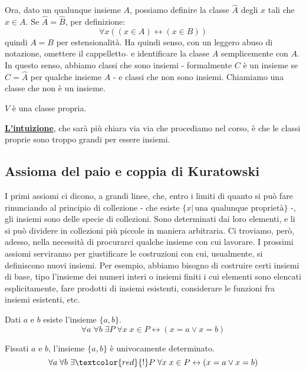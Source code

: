\documentclass[11pt]{scrartcl}
\begin{document}
Ora, dato un qualunque insieme $A$, possiamo definire la classe $\hat{A}$ degli $x$ tali che $x \in A$. Se $\hat{A} = \hat{B}$, per definizione:
\[ \forall x ((x \in A) \leftrightarrow (x \in B))
	\]
quindi $A = B$ per estensionalità. Ha quindi senso, con un leggero abuso di notazione, omettere il cappelletto $\hat{}$ e identificare la classe $\hat{A}$ semplicemente con $A$. In questo senso,
abbiamo classi che sono insiemi - formalmente $C$ è un insieme se $C = \hat{A}$ per qualche insieme $A$ - e classi che non sono insiemi. Chiamiamo  una classe che non è un insieme.

\begin{example}
$V$ è una classe propria.
\end{example}

\textbf{\underline{L'intuizione}}, che sarà più chiara via via che procediamo nel corso, è che le classi proprie sono troppo grandi per essere insiemi.

\subsection{Assioma del paio e coppia di Kuratowski}
I primi assiomi ci dicono, a grandi linee, che, entro i limiti di quanto si può fare rinunciando al principio di collezione - che esiste $\{x | \, \text{una qualunque proprietà}\}$ -, gli insiemi sono delle specie di collezioni.
Sono determinati dai loro elementi, e li si può dividere in collezioni più piccole in maniera arbitraria. Ci troviamo, però, adesso, nella necessità di procurarci qualche insieme con cui lavorare. I prossimi assiomi serviranno per giustificare le costruzioni con cui,
usualmente, si definiscono nuovi insiemi. Per esempio, abbiamo bisogno di costruire certi insiemi di base, tipo l'insieme dei numeri interi o insiemi finiti i cui elementi sono elencati esplicitamente, fare prodotti di insiemi esistenti, 
considerare le funzioni fra insiemi esistenti, etc.

\begin{axiom}
\label{ax4}
Dati $a$ e $b$ esiste l'insieme $\{a,b\}$.
\[ \forall a \; \forall b \; \exists P \; \forall x \; x \in P \leftrightarrow (x = a \lor x = b)
	\]
\end{axiom}

\begin{proposition}
Fissati $a$ e $b$, l'insieme $\{a,b\}$ è univocamente determinato.
\[\forall a \; \forall b \; \exists\textcolor{red}{!} P \; \forall x \; x \in P \leftrightarrow (x = a \lor x = b)
	\]
\end{proposition}
\end{document}
